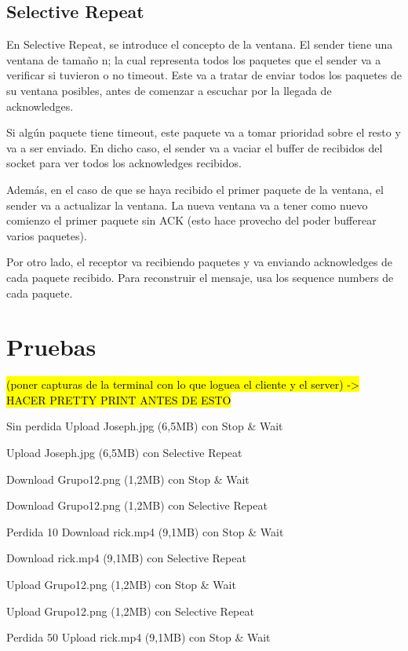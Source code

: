 \documentclass{article}
\begin{document}
\subsection{Selective Repeat}\label{selective-repeat}

En Selective Repeat, se introduce el concepto de la ventana. El sender tiene una ventana de tamaño n; la cual representa todos los paquetes que el sender va a verificar si tuvieron o no timeout. Este va a tratar de enviar todos los paquetes de su ventana posibles, antes de comenzar a escuchar por la llegada de acknowledges.

Si algún paquete tiene timeout, este paquete va a tomar prioridad sobre el resto y va a ser enviado. En dicho caso, el sender va a vaciar el buffer de recibidos del socket para ver todos los acknowledges recibidos.

Además, en el caso de que se haya recibido el primer paquete de la ventana, el sender va a actualizar la ventana. La nueva ventana va a tener como nuevo comienzo el primer paquete sin ACK (esto hace provecho del poder bufferear varios paquetes).

Por otro lado, el receptor va recibiendo paquetes y va enviando acknowledges de cada paquete recibido. Para reconstruir el mensaje, usa los sequence numbers de cada paquete.

\section{\texorpdfstring{\textbf{Pruebas}}{Pruebas}}\label{pruebas-wip}

\hl{(poner capturas de la terminal con lo que loguea el cliente y el
server) -\textgreater{} HACER PRETTY PRINT ANTES DE ESTO}

Sin perdida
Upload Joseph.jpg (6,5MB) con Stop & Wait

Upload Joseph.jpg (6,5MB) con Selective Repeat


Download Grupo12.png (1,2MB) con Stop & Wait

Download Grupo12.png (1,2MB) con Selective Repeat

Perdida 10%
Download rick.mp4 (9,1MB) con Stop & Wait

Download rick.mp4 (9,1MB) con Selective Repeat


Upload Grupo12.png (1,2MB) con Stop & Wait

Upload Grupo12.png (1,2MB) con Selective Repeat


Perdida 50%
Upload rick.mp4 (9,1MB) con Stop & Wait
\end{document}
